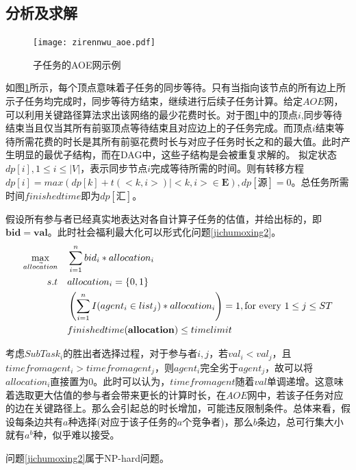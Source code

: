 \documentclass[promaster]{thesis-uestc}
\begin{document}
\subsection{分析及求解}
\begin{figure}[h]
\texttt{[image: zirennwu\_aoe.pdf]}
\caption{子任务的AOE网示例}
\label{zirennwu_aoe}
\end{figure}

如图\ref{zirennwu_aoe}所示，每个顶点意味着子任务的同步等待。只有当指向该节点的所有边上所示子任务均完成时，同步等待方结束，继续进行后续子任务计算。给定$AOE$网，可以利用关键路径算法求出该网络的最少花费时长。对于图\ref{zirennwu_aoe}中的顶点$i$,同步等待结束当且仅当其所有前驱顶点等待结束且对应边上的子任务完成。而顶点$i$结束等待所需花费的时长是其所有前驱花费时长与对应子任务时长之和的最大值。此时产生明显的最优子结构，而在DAG中，这些子结构是会被重复求解的。
拟定状态$dp[i],1 \leq i\leq |V|$，表示同步节点$i$完成等待所需的时间。则有转移方程$dp[i] = max(dp[k]+t(<k,i>)|<k,i> \in \mathbf{E}),dp[\text{源}] = 0$。总任务所需时间$finishedtime$即为$dp[\text{汇}]$。

假设所有参与者已经真实地表达对各自计算子任务的估值，并给出标的，即$\mathbf{bid}=\mathbf{val}$。此时社会福利最大化可以形式化问题\ref{jichumoxing2}。
\begin{align}
    \label{jichumoxing2}\max_{\vec{allocation}} \quad&\sum_{i=1}^{n}{bid_i*allocation_i}\\
    s.t                     \quad&allocation_i = \{0,1\}\notag\\
    \quad&\left(\sum_{i=1}^{n}{I(agent_i \in list_j)*allocation_i}\right) = 1,\text{for every }1 \leq j \leq ST\notag\\
    \quad&finishedtime(\mathbf{allocation}) \leq timelimit
    \notag
\end{align}

考虑$SubTask_i$的胜出者选择过程，对于参与者$i,j$，若$val_i < val_j$，且$timefromagent_i > timefromagent_j$，则$agent_i$完全劣于$agent_j$，故可以将$allocation_i$直接置为0。此时可以认为，$timefromagent$随着$val$单调递增。这意味着选取更大估值的参与者会带来更长的计算时长，在$AOE$网中，若该子任务对应的边在关键路径上。那么会引起总的时长增加，可能违反限制条件。总体来看，假设每条边共有$a$种选择(对应于该子任务的$a$个竞争者)，那么$b$条边，总可行集大小就有$a^b$种，似乎难以接受。

\begin{theorem}
   问题\ref{jichumoxing2}属于NP-hard问题。
\end{theorem}
\end{document}
